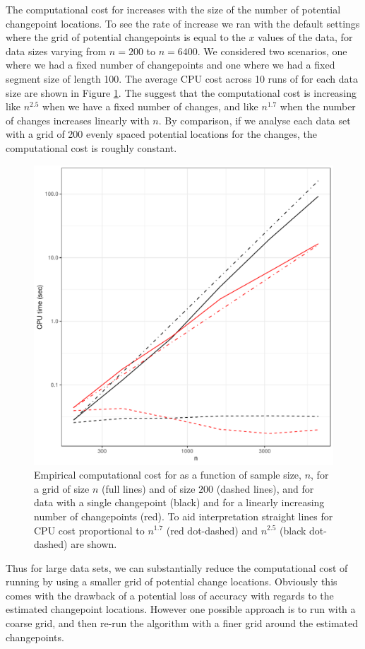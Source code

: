 \documentclass[article]{jss}
\begin{document}
The computational cost for  increases with the size of the number of potential changepoint locations. To see the rate of increase we ran  with the default settings where the grid of potential changepoints is equal to the $x$ values of the data, for data sizes varying from $n=200$ to $n=6400$. We considered two scenarios, one where we had a fixed number of changepoints and one where we had a fixed segment size of length 100. The average CPU cost across 10 runs of  for each data size are shown in Figure \ref{fig:cpop-CPU}. The suggest that the computational cost is increasing like $n^{2.5}$ when we have a fixed number of changes, and like $n^{1.7}$ when the number of changes increases linearly with $n$. By comparison, if we analyse each data set with a grid of 200 evenly spaced potential locations for the changes, the computational cost is roughly constant.

\begin{figure}
\centering
\includegraphics[width=0.6\linewidth]{figures/cpop_CPU_ggplot.pdf}
\caption{Empirical computational cost for  as a function of sample size, $n$, for a grid of size $n$ (full lines) and of size $200$ (dashed lines), and for data with a single changepoint (black) and for a linearly increasing number of changepoints (red). To aid interpretation straight lines for CPU cost proportional to $n^{1.7}$ (red dot-dashed) and $n^{2.5}$ (black dot-dashed) are shown.}
\label{fig:cpop-CPU}
\end{figure}

Thus for large data sets, we can substantially reduce the computational cost of running  by using a smaller grid of potential change locations. Obviously this comes with the drawback of a potential loss of accuracy with regards to the estimated changepoint locations. However one possible approach is to run  with a coarse grid, and then re-run the algorithm with a finer grid around the estimated changepoints.
\end{document}

